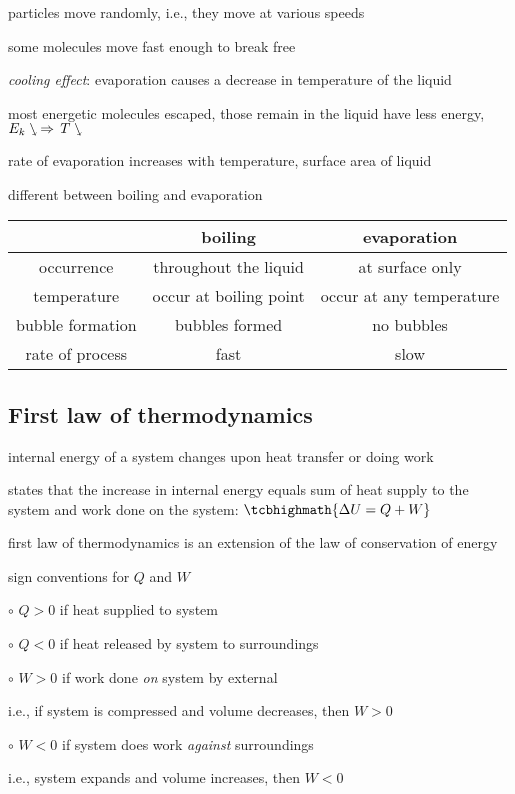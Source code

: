 particles move randomly, i.e., they move at various speeds

some molecules move fast enough to break free

\cmt \emph{cooling effect}: evaporation causes a decrease in temperature of the liquid

most energetic molecules escaped, those remain in the liquid have less energy, $E_k \ssearrow \, \Rightarrow \, T \ssearrow$

\cmt rate of evaporation increases with temperature, surface area of liquid

\cmt different between boiling and evaporation

\begin{center}
	\begin{tabular}{|c|c|c|}
		\hline 
		& boiling & evaporation \\ 
		\hline 
		occurrence & throughout the liquid & at surface only \\ 
		\hline 
		temperature & occur at boiling point & occur at any temperature \\ 
		\hline 
		bubble formation & bubbles formed & no bubbles \\ 
		\hline 
		rate of process & fast & slow \\ 
		\hline 
	\end{tabular} 
\end{center}

\subsection{First law of thermodynamics}

internal energy of a system changes upon heat transfer or doing work

\begin{ilight}
	 states that the increase in internal energy equals sum of heat supply to the system and work done on the system: $\tcbhighmath{\Delta U = Q +  W}$
\end{ilight}

\cmt first law of thermodynamics is an extension of the law of conservation of energy

\cmt sign conventions for $Q$ and $W$

\begin{compactitem}
	\item[$\circ$] $Q>0$ if heat supplied to system
	
	\item[$\circ$] $Q<0$ if heat released by system to surroundings
	
	\item[$\circ$] $W>0$ if work done \emph{on} system by external
	
	i.e., if system is compressed and volume decreases, then $W>0$
	
	\item[$\circ$] $W<0$ if system does work \emph{against} surroundings
	
	i.e., system expands and volume increases, then $W<0$
	
\end{compactitem}

